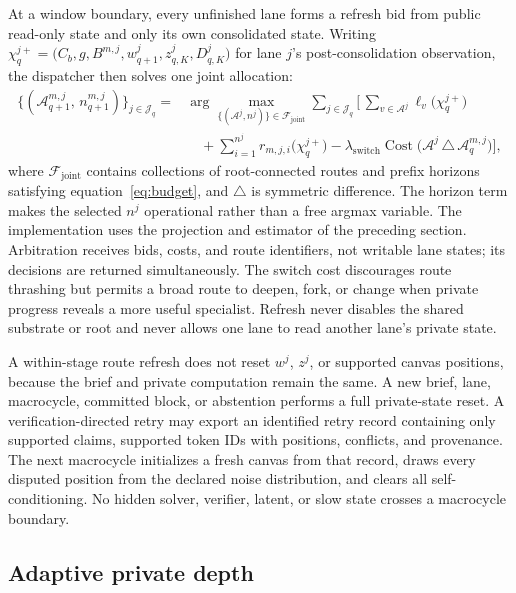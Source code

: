 \documentclass[10pt,a4paper]{article}
\newcommand{\op}[1]{\operatorname{#1}}
\newcommand{\Acal}{\mathcal{A}}
\newcommand{\Jcal}{\mathcal{J}}
\newcommand{\Fcal}{\mathcal{F}}
\begin{document}
At a window boundary, every unfinished lane forms a refresh bid from public
read-only state and only its own consolidated state. Writing
$\chi^{j+}_q = \bigl( C_b, g, B^{m,j}, w^j_{q+1}, z^j_{q,K}, D^j_{q,K} \bigr)$
for lane $j$'s post-consolidation observation, the dispatcher then solves one
joint allocation:
\begin{equation}
\begin{aligned}
\{(\Acal^{m,j}_{q+1},\, n^{m,j}_{q+1})\}_{j \in \Jcal_q}
={}& \arg\max_{\{(\Acal^j, n^j)\} \in \Fcal_{\mathrm{joint}}}
\sum_{j \in \Jcal_q} \Biggl[\,
\sum_{v \in \Acal^j} \ell_v\bigl( \chi^{j+}_q \bigr) \\
&\quad + \sum_{i=1}^{n^j} r_{m,j,i}\bigl( \chi^{j+}_q \bigr)
- \lambda_{\mathrm{switch}} \op{Cost}\bigl( \Acal^j \,\triangle\,
  \Acal^{m,j}_q \bigr) \Biggr],
\end{aligned}
\label{eq:jointrefresh}
\end{equation}
where $\Fcal_{\mathrm{joint}}$ contains collections of root-connected routes
and prefix horizons satisfying equation~\eqref{eq:budget}, and $\triangle$ is
symmetric difference. The horizon term makes the selected $n^j$ operational
rather than a free argmax variable. The implementation uses the projection and
estimator of the preceding section. Arbitration receives bids, costs, and
route identifiers, not writable lane states; its decisions are returned
simultaneously. The switch cost discourages route thrashing but permits a
broad route to deepen, fork, or change when private progress reveals a more
useful specialist. Refresh never disables the shared substrate or root and
never allows one lane to read another lane's private state.

A within-stage route refresh does not reset $w^j$, $z^j$, or supported canvas
positions, because the brief and private computation remain the same. A new
brief, lane, macrocycle, committed block, or abstention performs a full
private-state reset. A verification-directed retry may export an identified
retry record containing only supported claims, supported token IDs with
positions, conflicts, and provenance. The next macrocycle initializes a fresh
canvas from that record, draws every disputed position from the declared noise
distribution, and clears all self-conditioning. No hidden solver, verifier,
latent, or slow state crosses a macrocycle boundary.

\subsection{Adaptive private depth}
\label{sec:halting}
\end{document}
